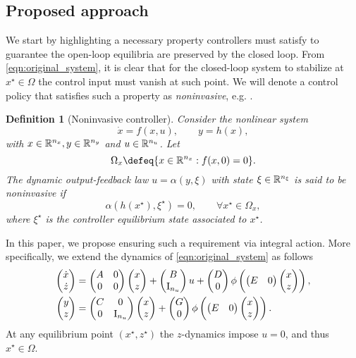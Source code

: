 \documentclass{ifacconf}
\newtheorem{definition}{Definition}
\begin{document}
\subsection{Proposed approach}
We start by highlighting a necessary property controllers must satisfy to guarantee the open-loop equilibria are preserved by the closed loop.
From \eqref{eqn:original_system}, it is clear that for the closed-loop system to stabilize at  $x^\star\in\Omega$ the control input must vanish at such point.
We will denote a control policy that satisfies such a property as \textit{noninvasive}, e.g. \citep{ANGELI2024152}. 
\begin{definition}[Noninvasive controller]
Consider the nonlinear system 
\[
\dot x = f(x,u), \qquad y =h(x),
\]
with $x\in{\mathbb{R}}^{n_x}, y\in{\mathbb{R}}^{n_y}$ and $u\in{\mathbb{R}}^{n_u}$. Let 
\[
\Omega_x\defeq\{x\in\RR^{n_x}:f(x,0)=0\}.
\]
The dynamic output-feedback law $u=\alpha(y,\xi)$  with state $\xi\in{\mathbb{R}}^{n_\xi}$ is said to be \textit{ noninvasive} if 
\begin{equation}\label{eqn:noninvasive_cond}
\alpha(h(x^\star),\xi^\star) = 0, \qquad \forall x^\star \in \Omega_x,
\end{equation}
where $\xi^\star$ is the controller equilibrium state associated to $x^\star$.
\end{definition}

In this paper, we propose ensuring such a requirement via integral action. More specifically, we extend the dynamics of \eqref{eqn:original_system} as follows
\begin{equation}\label{eqn:extended_dyn}
\begin{aligned}
\left(\begin{matrix}\dot x\\ \dot z\end{matrix}\right)&= \left(\begin{matrix}A & 0\\0&0\end{matrix}\right) \left(\begin{matrix}x\\ z\end{matrix}\right) + \left(\begin{matrix}B\\\operatorname{I}_{n_u}\end{matrix}\right) u + \left(\begin{matrix}D\\0\end{matrix}\right) \phi\left(\left(\begin{matrix}E&0\end{matrix}\right) \left(\begin{matrix}x\\ z\end{matrix}\right) \right),  \\
 \left(\begin{matrix}y\\z\end{matrix}\right)&= \left(\begin{matrix}C & 0\\0 & \operatorname{I}_{n_u}\end{matrix}\right)\left(\begin{matrix}x\\ z\end{matrix}\right) + \left(\begin{matrix}G\\0\end{matrix}\right) \phi\left(\left(\begin{matrix}E&0\end{matrix}\right)\left(\begin{matrix}x\\ z\end{matrix}\right) \right).
\end{aligned}
\end{equation}
At any equilibrium point $(x^\star,z^\star)$ the $z$-dynamics impose $u=0$, and thus $x^\star \in \Omega$. 
\end{document}

